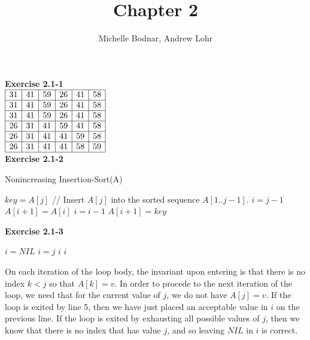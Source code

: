 \documentclass{article}
\title{Chapter 2}
\author{Michelle Bodnar, Andrew Lohr}
\begin{document}
\maketitle

\noindent\textbf{ Exercise 2.1-1} \\

$
\begin{array}{|c|c|c|c|c|c|}
\hline
31&41&59&26&41&58\\
\hline
31&41&59&26&41&58\\
\hline
31&41&59&26&41&58\\
\hline
26&31&41&59&41&58\\
\hline
26&31&41&41&59&58\\
\hline
26&31&41&41&58&59\\
\hline
\end{array}
$ \\

\noindent\textbf{ Exercise 2.1-2}\\

\begin{algorithm}
\caption{Nonincreasing Insertion-Sort(A)}
\begin{algorithmic}[1]
	\State $key = A[j]$
	\State // Insert $A[j]$ into the sorted sequence $A[1..j-1]$.
	\State $i=j-1$
		\State $A[i+1] = A[i]$
		\State $i=i-1$
	\EndWhile
\EndFor
\State $A[i+1] = key$
\end{algorithmic}
\end{algorithm}


\noindent\textbf{ Exercise 2.1-3}\\

\begin{algorithm} \begin{algorithmic}[1]
 \State $i=NIL$
 \State $i = j$
 \State \Return $i$
 \EndIf 
\State \Return $i$
 \EndFor
 \end{algorithmic}
\end{algorithm}
On each iteration of the loop body, the invariant upon entering is that there is no index $k<j$ so that $A[k]=v$. In order to procede to the next iteration of the loop, we need that for the current value of $j$, we do not have $A[j] =v$. If the loop is exited by line 5, then we have just placed an acceptable value in $i$ on the previous line. If the loop is exited by exhausting all possible values of $j$, then we know that there is no index that has value $j$, and so leaving $NIL$ in $i$ is correct. \\
\end{document}
